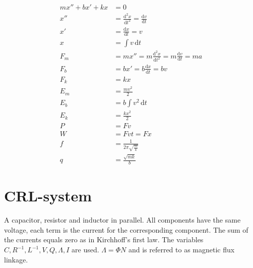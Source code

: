 \documentclass[]{elementary-physics}
\begin{document}
\begin{subequations}
\begin{align}
m x'' + b x' + k x &= 0 \\
x'' &= \frac{\mathrm{d}^2 x}{\mathrm{d}t^2} = \frac{\mathrm{d}v}{\mathrm{d}t} \tag{definition of acceleration} \\
x' &= \frac{\mathrm{d}x}{\mathrm{d}t} = v \tag{definition of velocity} \\
x &= \int v \, \mathrm{d}t \\
F_m &= m x'' = m \frac{\mathrm{d}^2 x}{\mathrm{d}t^2} = m \frac{\mathrm{d}v}{\mathrm{d}t} = m a \tag{Newton's 2nd law} \\
F_b &= b x' = b \frac{\mathrm{d}x}{\mathrm{d}t} = b v \\
F_k &= k x \tag{Hooke's law} \\
E_m &= \frac{m v^2}{2} \tag{kinetic energy} \\
E_b &= b \int v^2 \, \mathrm{d}t \tag{losses} \\
E_k &= \frac{k x^2}{2} \tag{energy in a spring} \\
P &= F v \tag{power} \\
W &= F v t = F x \tag{work} \\
f &= \frac{1}{2 \pi \sqrt{\frac{m}{k}}} \tag{frequency} \\
q &= \frac{\sqrt{m k}}{b} \tag{quality factor}
\end{align}
\end{subequations}

\pagebreak

\section{CRL-system}

A capacitor, resistor and inductor in parallel.
All components have the same voltage, each term is the current for the corresponding component.
The sum of the currents equals zero as in Kirchhoff's first law.
The variables $C,R^{-1},L^{-1},V,Q,\Lambda,I$ are used.
$\Lambda = \Phi N$ and is referred to as magnetic flux linkage.
\end{document}
